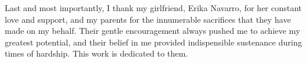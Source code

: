 Last and most importantly, I thank my girlfriend, Erika Navarro, for her constant love and support, and my parents for the innumerable sacrifices that they have made on my behalf.
Their gentle encouragement always pushed me to achieve my greatest potential, and their belief in me provided indispensible sustenance during times of hardship. 
This work is dedicated to them.
